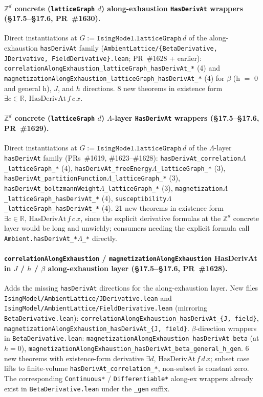 \documentclass[a4paper,11pt]{article}
\newcommand{\LeanLambda}{\texorpdfstring{\ensuremath{\Lambda}}{Lambda}}
\begin{document}
\paragraph{$\mathbb{Z}^d$ concrete (\texttt{latticeGraph} $d$)
along-exhaustion \texttt{HasDerivAt} wrappers
(\S17.5--\S17.6, PR~\#1630).} Direct instantiations at
$G := \texttt{IsingModel.latticeGraph}\,d$ of the
along-exhaustion \texttt{hasDerivAt} family
(\texttt{AmbientLattice/\{BetaDerivative, JDerivative,
FieldDerivative\}.lean}; PR~\#1628 + earlier):
\texttt{correlationAlongExhaustion\_latticeGraph\_hasDerivAt\_*}
(4) and
\texttt{magnetizationAlongExhaustion\_latticeGraph\_hasDerivAt\_*}
(4) for $\beta$ (h $=$ 0 and general h), $J$, and $h$ directions.
8 new theorems in existence form
$\exists c \in \mathbb{R},\,\mathrm{HasDerivAt}\,f\,c\,x$.

\paragraph{$\mathbb{Z}^d$ concrete (\texttt{latticeGraph} $d$)
$\Lambda$-layer \texttt{HasDerivAt} wrappers
(\S17.5--\S17.6, PR~\#1629).} Direct instantiations at
$G := \texttt{IsingModel.latticeGraph}\,d$ of the
$\Lambda$-layer \texttt{hasDerivAt} family
(PRs~\#1619, \#1623--\#1628):
\texttt{hasDerivAt\_correlation\LeanLambda\_latticeGraph\_*} (4),
\texttt{hasDerivAt\_freeEnergy\LeanLambda\_latticeGraph\_*} (3),
\texttt{hasDerivAt\_partitionFunction\LeanLambda\_latticeGraph\_*} (3),
\texttt{hasDerivAt\_boltzmannWeight\LeanLambda\_latticeGraph\_*} (3),
\texttt{magnetization\LeanLambda\_latticeGraph\_hasDerivAt\_*} (4),
\texttt{susceptibility\LeanLambda\_latticeGraph\_hasDerivAt\_*} (4).
21 new theorems in existence form
$\exists c \in \mathbb{R},\,\mathrm{HasDerivAt}\,f\,c\,x$, since
the explicit derivative formulas at the $\mathbb{Z}^d$ concrete
layer would be long and unwieldy; consumers needing the explicit
formula call \texttt{Ambient.hasDerivAt\_*\LeanLambda\_*} directly.

\paragraph{\texttt{correlationAlongExhaustion} /
\texttt{magnetizationAlongExhaustion} HasDerivAt in $J$ / $h$
/ $\beta$ along-exhaustion layer
(\S17.5--\S17.6, PR~\#1628).} Adds the missing
\texttt{hasDerivAt} directions for the along-exhaustion layer.
New files
\texttt{IsingModel/AmbientLattice/JDerivative.lean} and
\texttt{IsingModel/AmbientLattice/FieldDerivative.lean}
(mirroring \texttt{BetaDerivative.lean}):
\texttt{correlationAlongExhaustion\_hasDerivAt\_\{J, field\}},
\texttt{magnetizationAlongExhaustion\_hasDerivAt\_\{J, field\}}.
$\beta$-direction wrappers in
\texttt{BetaDerivative.lean}:
\texttt{magnetizationAlongExhaustion\_hasDerivAt\_beta} (at $h = 0$),
\texttt{magnetizationAlongExhaustion\_hasDerivAt\_beta\_general\_h\_gen}.
6 new theorems with existence-form derivative
$\exists d,\,\mathrm{HasDerivAt}\,f\,d\,x$; subset case lifts to
finite-volume \texttt{hasDerivAt\_correlation\_*}, non-subset is
constant zero. The corresponding \texttt{Continuous*} /
\texttt{Differentiable*} along-ex wrappers already exist in
\texttt{BetaDerivative.lean} under the \texttt{\_gen} suffix.
\end{document}
